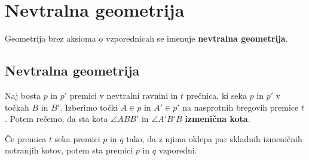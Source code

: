 \chapter{Nevtralna geometrija}

    Geometrija brez aksioma o vzporednicah se imenuje \textbf{nevtralna geometrija}.

\section{Nevtralna geometrija}

    \begin{definicija}
        Naj bosta $p$ in $p'$ premici v nevtralni ravnini in $t$ prečnica, ki seka $p$ in $p'$ v točkah $B$ in $B'$. Izberimo točki $A\in p$ in $A'\in p'$ na nasprotnih bregovih premice $t$. Potem rečemo, da sta kota $\angle ABB'$ in $\angle A'B'B$ \textbf{izmenična kota}.
    \end{definicija}

    \begin{trditev}
        Če premica $t$ seka premici $p$ in $q$ tako, da z njima oklepa par skladnih izmeničnih notranjih kotov, potem sta premici $p$ in $q$ vzporedni.
    \end{trditev}


